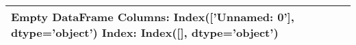 \begin{tabular}{ll}
\toprule
Empty DataFrame
Columns: Index(['Unnamed: 0'], dtype='object')
Index: Index([], dtype='object') \\
\bottomrule
\end{tabular}

